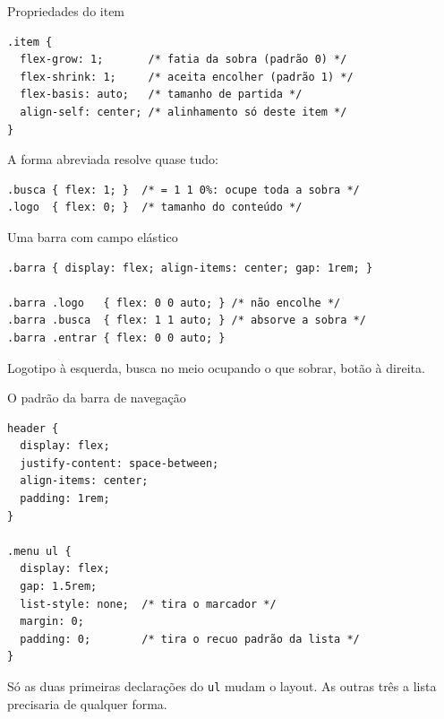 \documentclass{beamer}
\begin{document}
\begin{frame}[fragile]{Propriedades do item}
	\begin{verbatim}
.item {
  flex-grow: 1;       /* fatia da sobra (padrão 0) */
  flex-shrink: 1;     /* aceita encolher (padrão 1) */
  flex-basis: auto;   /* tamanho de partida */
  align-self: center; /* alinhamento só deste item */
}
  \end{verbatim}

	\vspace{0.2cm}
	A forma abreviada resolve quase tudo:

	\begin{verbatim}
.busca { flex: 1; }  /* = 1 1 0%: ocupe toda a sobra */
.logo  { flex: 0; }  /* tamanho do conteúdo */
  \end{verbatim}
\end{frame}

\begin{frame}[fragile]{Uma barra com campo elástico}
	\begin{verbatim}
.barra { display: flex; align-items: center; gap: 1rem; }

.barra .logo   { flex: 0 0 auto; } /* não encolhe */
.barra .busca  { flex: 1 1 auto; } /* absorve a sobra */
.barra .entrar { flex: 0 0 auto; }
  \end{verbatim}

	\vspace{0.3cm}
	Logotipo à esquerda, busca no meio ocupando o que sobrar, botão à direita.
\end{frame}

\begin{frame}[fragile]{O padrão da barra de navegação}
	\begin{verbatim}
header {
  display: flex;
  justify-content: space-between;
  align-items: center;
  padding: 1rem;
}

.menu ul {
  display: flex;
  gap: 1.5rem;
  list-style: none;  /* tira o marcador */
  margin: 0;
  padding: 0;        /* tira o recuo padrão da lista */
}
  \end{verbatim}

	\vspace{0.2cm}
	Só as duas primeiras declarações do \texttt{ul} mudam o layout. As outras três
	a lista precisaria de qualquer forma.
\end{frame}
\end{document}
